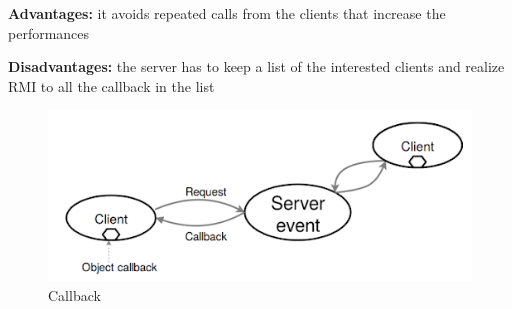 \textbf{Advantages:} it avoids repeated calls from the clients that increase the performances

\textbf{Disadvantages:} the server has to keep a list of the interested clients and realize RMI to all the callback in the list

\begin{figure}[!h]
            \centering
            \includegraphics[width=.7\linewidth]{images/InterprocessCommunication/callback.png}
            \caption{Callback}
    \end{figure}
